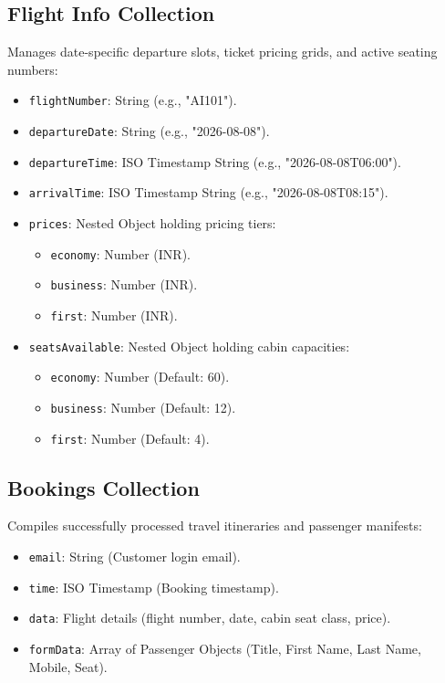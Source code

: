 \documentclass[12pt,a4paper]{article}
\begin{document}
\subsection{Flight Info Collection}
Manages date-specific departure slots, ticket pricing grids, and active seating numbers:
\begin{itemize}
    \item \texttt{flightNumber}: String (e.g., "AI101").
    \item \texttt{departureDate}: String (e.g., "2026-08-08").
    \item \texttt{departureTime}: ISO Timestamp String (e.g., "2026-08-08T06:00").
    \item \texttt{arrivalTime}: ISO Timestamp String (e.g., "2026-08-08T08:15").
    \item \texttt{prices}: Nested Object holding pricing tiers:
    \begin{itemize}
        \item \texttt{economy}: Number (INR).
        \item \texttt{business}: Number (INR).
        \item \texttt{first}: Number (INR).
    \end{itemize}
    \item \texttt{seatsAvailable}: Nested Object holding cabin capacities:
    \begin{itemize}
        \item \texttt{economy}: Number (Default: 60).
        \item \texttt{business}: Number (Default: 12).
        \item \texttt{first}: Number (Default: 4).
    \end{itemize}
\end{itemize}

\subsection{Bookings Collection}
Compiles successfully processed travel itineraries and passenger manifests:
\begin{itemize}
    \item \texttt{email}: String (Customer login email).
    \item \texttt{time}: ISO Timestamp (Booking timestamp).
    \item \texttt{data}: Flight details (flight number, date, cabin seat class, price).
    \item \texttt{formData}: Array of Passenger Objects (Title, First Name, Last Name, Mobile, Seat).
\end{itemize}
\end{document}
